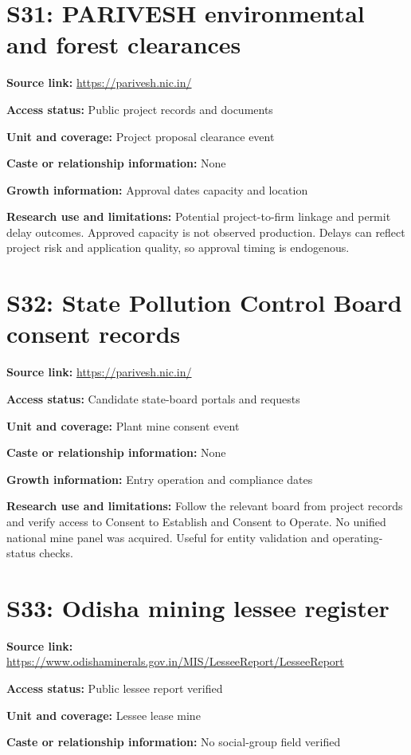 \documentclass[11pt,a4paper]{report}
\begin{document}
\section{S31: PARIVESH environmental and forest clearances}\hypertarget{S31}{}
\textbf{Source link:} \url{https://parivesh.nic.in/}

\textbf{Access status:} Public project records and documents

\textbf{Unit and coverage:} Project proposal clearance event

\textbf{Caste or relationship information:} None

\textbf{Growth information:} Approval dates capacity and location

\textbf{Research use and limitations:} Potential project-to-firm linkage and permit delay outcomes. Approved capacity is not observed production. Delays can reflect project risk and application quality, so approval timing is endogenous.

\section{S32: State Pollution Control Board consent records}\hypertarget{S32}{}
\textbf{Source link:} \url{https://parivesh.nic.in/}

\textbf{Access status:} Candidate state-board portals and requests

\textbf{Unit and coverage:} Plant mine consent event

\textbf{Caste or relationship information:} None

\textbf{Growth information:} Entry operation and compliance dates

\textbf{Research use and limitations:} Follow the relevant board from project records and verify access to Consent to Establish and Consent to Operate. No unified national mine panel was acquired. Useful for entity validation and operating-status checks.

\section{S33: Odisha mining lessee register}\hypertarget{S33}{}
\textbf{Source link:} \url{https://www.odishaminerals.gov.in/MIS/LesseeReport/LesseeReport}

\textbf{Access status:} Public lessee report verified

\textbf{Unit and coverage:} Lessee lease mine

\textbf{Caste or relationship information:} No social-group field verified
\end{document}
